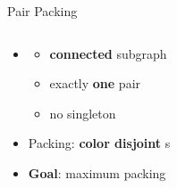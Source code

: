 \begin{frame}{Pair Packing}
\begin{columns}[T]
\begin{column}{.63\linewidth}
\begin{itemize}

\item<1->\alert{\Pack{}} 
	\begin{itemize}
	\item<2->
	\textbf{connected} subgraph
	\item<3->
	exactly \textbf{one} pair
	\item<4->
	no singleton
	\end{itemize}

\item<7->
\alert{Packing}: \textbf{color disjoint} \pack{}s

\item<9->
\textbf{Goal}: maximum packing 


\end{itemize}
\end{column}
\hfill
\begin{column}{.37\linewidth}
\end{column}
\end{columns}
\end{frame}